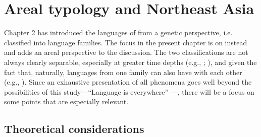 \chapter{Areal typology and Northeast Asia}\label{sec:3}

Chapter 2 has introduced the languages of  from a genetic perspective, i.e. classified into language families. The focus in the present chapter is on  instead and adds an areal perspective to the discussion. The two classifications are not always clearly separable, especially at greater time depths (e.g., \citealt{Nichols2010}; \citealt{Operstein2015}), and given the fact that, naturally, languages from one family can also have  with each other (e.g., \citealt{Epps2013}). Since an exhaustive presentation of all  phenomena goes well beyond the possibilities of this study---“Language  is everywhere” \citep[8]{Thomason2001}---, there will be a focus on some points that are especially relevant.

\section{Theoretical considerations}\label{sec:3.1}

